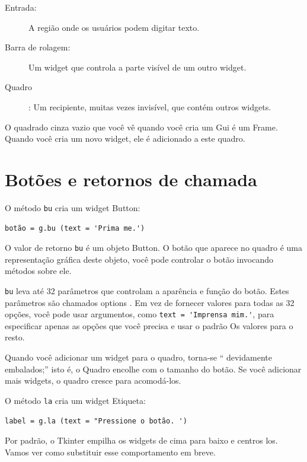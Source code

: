 \documentclass[10pt]{book}
\begin{document}
\begin{v erbatim}
\begin{description}
\item[Entrada:] A região onde os usuários podem digitar texto.

\item[Barra de rolagem:] Um widget que controla a parte visível de um outro
widget.

\item[Quadro]: Um recipiente, muitas vezes invisível, que contém outros
widgets.

\end{description}

O quadrado cinza vazio que você vê quando você cria um Gui é
um Frame. Quando você cria um novo widget, ele é adicionado a este quadro.



\section{Botões e retornos de chamada}

O método {\tt bu} cria um widget Button:

\begin{verbatim}
botão = g.bu (text = 'Prima me.')
\end{verbatim}
%
O valor de retorno {\tt bu} é um objeto Button. O botão
que aparece no quadro é uma representação gráfica deste
objeto, você pode controlar o botão invocando métodos sobre ele.

{\tt bu} leva até 32 parâmetros que controlam a aparência
e função do botão. Estes parâmetros são chamados
{options \bf}. Em vez de fornecer valores para todas as 32 opções,
você pode usar argumentos, como \verb "text = 'Imprensa mim.'",
para especificar apenas as opções que você precisa e usar o padrão
Os valores para o resto.

Quando você adicionar um widget para o quadro, torna-se `` devidamente embalados;''
isto é, o Quadro encolhe com o tamanho do botão. Se você
adicionar mais widgets, o quadro cresce para acomodá-los.

O método {\tt la} cria um widget Etiqueta:

\begin{verbatim}
label = g.la (text = "Pressione o botão. ')
\end{verbatim}
%
Por padrão, o Tkinter empilha os widgets de cima para baixo e centros
los. Vamos ver como substituir esse comportamento em breve.


\end{v erbatim}
\end{document}
